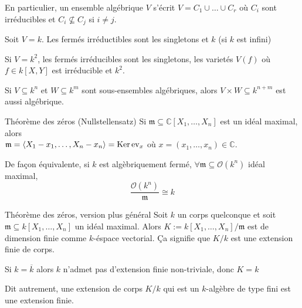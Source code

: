 En particulier, un ensemble algébrique \(V\) s'écrit \(V = C_{1} \cup \dots \cup
C_r\) où \(C_{i}\) sont irréducibles et \(C_{i} \not\subseteq C_{j} \) si \(i
\neq j\).

\begin{eser}{}
    Soit \(V = k\). Les fermés irréductibles sont les singletons et \(k\) (si
    \(k\) est infini)

    Si \(V = k^2\), les fermés irréducibles sont les singletons, les varietés
    \(V{(f)}\) où \(f \in k[X, Y]\) est irréducible et \(k^2\).
\end{eser}

\begin{eser}{}
    Si \(V \subseteq k^{n} \) et \(W \subseteq k^{m}  \) sont sous-ensembles
    algébriques, alors \(V \times  W \subseteq k^{n+m} \) est aussi algébrique.
\end{eser}

\begin{theorem}{Théorème des zéros (Nullstellensatz)}
    Si \(\mathfrak{m} \subseteq \mathbb{C}[X_{1}, \dots, X_{n}] \) est un idéal
    maximal, alors \\\(\mathfrak{m} = {\left\langle X_{1} - x_{1}, \dots, X_{n} - x_{n}\right\rangle}
    = \mathrm{Ker}\,\mathrm{ev}_x\) où \(x = {(x_{1}, \dots, x_{n})} \in \mathbb{C}\).

    De façon équivalente, si \(k\) est algèbriquement fermé, \(\forall
    \mathfrak{m} \subseteq \mathcal{O}{(k^{n})}
    \) idéal maximal, 
    \[
      \frac{\mathcal{O}{(k^{n})}}{\mathfrak{m}} \cong k
    \]
\end{theorem}

\begin{theorem}{Théorème des zéros, version plus général}
    Soit \(k\) un corps quelconque et soit \(\mathfrak{m} \subseteq k[X_{1},
    \dots, X_{n}] \) un idéal maximal. Alors \(K := k[X_{1}, \dots, X_{n}] /
    \mathfrak{m}\) est de dimension finie comme \(k\)-éspace vectorial. Ça
    signifie que \(K / k\) est une extension finie de corps.
\end{theorem}

\begin{remark}{}
    Si \(k = \overline{k}\) alors \(k\) n'admet pas d'extension finie
    non-triviale, donc \(K = k\) 
\end{remark}

\begin{note}{}
    Dit autrement, une extension de corps \(K / k\) qui est un \(k\)-algèbre de
    type fini est une extension finie.
\end{note}

